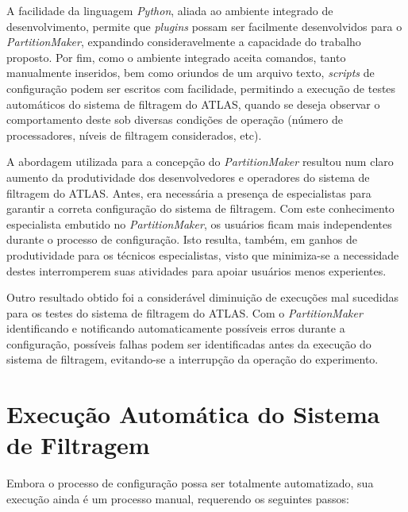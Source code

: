 A facilidade da linguagem \emph{Python}, aliada ao ambiente integrado de desenvolvimento, permite que \emph{plugins} possam ser facilmente desenvolvidos para o \emph{PartitionMaker},  expandindo consideravelmente a capacidade do trabalho proposto. Por fim, como o ambiente integrado aceita comandos, tanto manualmente inseridos, bem como oriundos de um arquivo texto, \emph{scripts} de configuração podem ser escritos com facilidade, permitindo a execução de testes automáticos do sistema de filtragem do ATLAS, quando se deseja observar o comportamento deste sob diversas condições de operação (número de processadores, níveis de filtragem considerados, etc).

A abordagem utilizada para a concepção do \emph{PartitionMaker} resultou num claro aumento da produtividade dos desenvolvedores e operadores do sistema de filtragem do ATLAS. Antes, era necessária a presença de especialistas para garantir a correta configuração do sistema de filtragem. Com este conhecimento especialista embutido no \emph{PartitionMaker}, os usuários ficam mais independentes durante o processo de configuração. Isto resulta, também, em ganhos de produtividade para os técnicos especialistas, visto que minimiza-se a necessidade destes interromperem suas atividades para apoiar usuários menos experientes.

Outro resultado obtido foi a considerável diminuição de execuções mal sucedidas para os testes do sistema de filtragem do ATLAS. Com o \emph{PartitionMaker} identificando e notificando automaticamente possíveis erros durante a configuração, possíveis falhas podem ser identificadas antes da execução do sistema de filtragem, evitando-se a interrupção da operação do experimento.


\section{Execução Automática do Sistema de Filtragem}
\label{sec:runner}

Embora o processo de configuração possa ser totalmente automatizado, sua execução ainda é um processo manual, requerendo os seguintes passos:

